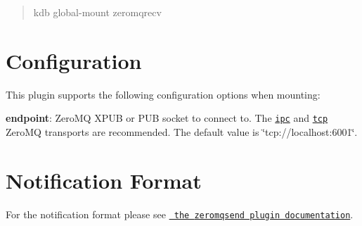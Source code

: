 \begin{quote}
kdb global-\/mount zeromqrecv \end{quote}
\hypertarget{autotoc_md904_autotoc_md908}{}\section{Configuration}\label{autotoc_md904_autotoc_md908}
This plugin supports the following configuration options when mounting\+:


\begin{DoxyItemize}
\item {\bfseries{endpoint}}\+: Zero\+MQ X\+P\+UB or P\+UB socket to connect to. The \href{http://api.zeromq.org/4-2:zmq-ipc}{\texttt{ {\ttfamily ipc}}} and \href{http://api.zeromq.org/4-2:zmq-tcp}{\texttt{ {\ttfamily tcp}}} Zero\+MQ transports are recommended. The default value is \char`\"{}tcp\+://localhost\+:6001\char`\"{}.
\end{DoxyItemize}\hypertarget{autotoc_md904_autotoc_md909}{}\section{Notification Format}\label{autotoc_md904_autotoc_md909}
For the notification format please see \href{https://www.libelektra.org/plugins/zeromqsend\#notification-format}{\texttt{ the {\ttfamily zeromqsend} plugin documentation}}. 